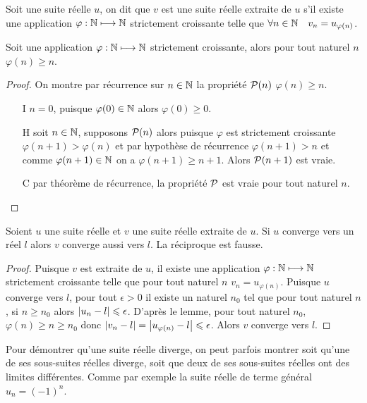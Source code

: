 \begin{defdef}
  Soit une suite réelle \(u\), on dit que \(v\) est une suite réelle extraite de \(u\) s'il existe une application \(\varphi:\N \longmapsto \N\) strictement croissante telle que \(\forall n\in \N \quad v_n=u_{\varphi(n)}\).
\end{defdef}
\begin{lemme}
  Soit une application \(\varphi:\N \longmapsto \N\) strictement croissante, alors pour tout naturel \(n\) \(\varphi(n) \geqslant n\).
\end{lemme}
\begin{proof}
  On montre par récurrence sur \(n \in \N\) la propriété \(\P(n)\) \(\varphi(n) \geqslant n\).
  \begin{itemize}
  \item[I] \(n=0\), puisque \(\varphi(0) \in \N\) alors \(\varphi(0) \geqslant 0\).
  \item[H] soit \(n \in \N\), supposons \(\P(n)\) alors puisque \(\varphi\) est strictement croissante \(\varphi(n+1) > \varphi(n)\) et par hypothèse de récurrence \(\varphi(n+1) > n\) et comme \(\varphi(n+1) \in \N\) on a \(\varphi(n+1) \geqslant n+1\). Alors \(\P(n+1)\) est vraie.
  \item[C] par théorème de récurrence, la propriété \(\P\) est vraie pour tout naturel \(n\).
  \end{itemize}
\end{proof}
\begin{prop}
  Soient \(u\) une suite réelle et \(v\) une suite réelle extraite de \(u\). Si \(u\) converge vers un réel \(l\) alors \(v\) converge aussi vers \(l\). La réciproque est fausse.
\end{prop}
\begin{proof}
  Puisque \(v\) est extraite de \(u\), il existe une application \(\varphi:\N \longmapsto \N\) strictement croissante telle que pour tout naturel \(n\) \(v_n=u_{\varphi(n)}\). Puisque \(u\) converge vers \(l\), pour tout \(\epsilon>0\) il existe un naturel \(n_0\) tel que pour tout naturel \(n\), si \(n \geqslant n_0\) alors \(\abs{u_n-l} \leqslant \epsilon\). D'après le lemme, pour tout naturel \(n_0\), \(\varphi(n) \geqslant n \geqslant n_0\) donc \(\abs{v_n-l}=\abs{u_{\varphi(n)}-l} \leqslant \epsilon\). Alors \(v\) converge vers \(l\).
\end{proof}
Pour démontrer qu'une suite réelle diverge, on peut parfois montrer soit qu'une de ses sous-suites réelles diverge, soit que deux de ses sous-suites réelles ont des limites différentes. Comme par exemple la suite réelle de terme général \(u_n=(-1)^n\).
